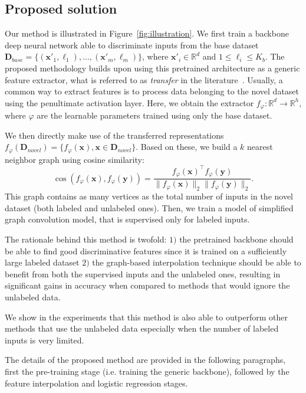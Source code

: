 \documentclass[a4paper,conference]{IEEEtran}
\begin{document}
\subsection{Proposed solution}

Our method is illustrated in Figure~\ref{fig:illustration}.
We first train a backbone deep neural network able to discriminate inputs from the base dataset $\mathbf{D}_{base}=\{(\mathbf{x'}_1, \ell_1),..., (\mathbf{x'}_m, \ell_m)\}$, where $\mathbf{x'}_i\in\mathbb{R}^d$ and $1\leq \ell_i \leq K_b$. The proposed methodology builds upon using this pretrained architecture as a generic feature extractor, what is referred to as \emph{transfer} in the literature~\cite{torrey2010transfer}. Usually, a common way to extract features is to process data belonging to the novel dataset using the penultimate activation layer. Here, we obtain the extractor $f_\varphi:\mathbb{R}^d\rightarrow\mathbb{R}^h$, where $\varphi$ are the learnable parameters trained using only the base dataset.

We then directly make use of the transferred representations $f_\varphi(\mathbf{D}_{novel}) = \{f_\varphi(\mathbf{x}), \mathbf{x}\in \mathbf{D}_{novel}\}$. Based on these, we build a $k$ nearest neighbor graph using cosine similarity: $$\cos(f_\varphi(\mathbf{x}),f_\varphi(\mathbf{y})) = \frac{f_\varphi(\mathbf{x})^\top f_\varphi(\mathbf{y})}{\|f_\varphi(\mathbf{x})\|_2\|f_\varphi(\mathbf{y})\|_2}.$$
This graph contains as many vertices as the total number of inputs in the novel dataset (both labeled and unlabeled ones).
Then, we train a model of simplified graph convolution model, that is supervised only for labeled inputs.

The rationale behind this method is twofold: $1)$ the pretrained backbone should be able to find good discriminative features since it is trained on a sufficiently large labeled dataset $2)$ the graph-based interpolation technique should be able to benefit from both the supervised inputs and the unlabeled ones, resulting in significant gains in accuracy when compared to methods that would ignore the unlabeled data. 

We show in the experiments that this method is also able to outperform other methods that use the unlabeled data especially when the number of labeled inputs is very limited.

The details of the proposed method are provided in the following paragraphs, first the pre-training stage (i.e. training the generic backbone), followed by the feature interpolation and logistic regression stages.
\end{document}
